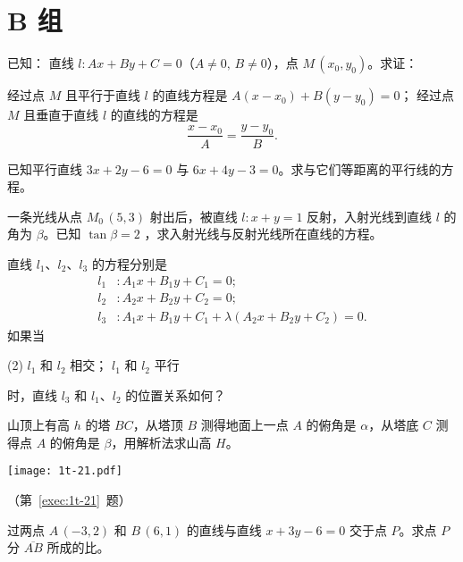 \section*{B 组}
\begin{question}[resume]
  \item 已知： 直线 $l:Ax+By+C=0$（$A\neq 0,\,B\neq 0$），点 $M\,(x_0,y_0)$。求证：
  \begin{tasks}
    \task 经过点 $M$ 且平行于直线 $l$ 的直线方程是 $A(x-x_0)+B(y-y_0)=0$；
    \task 经过点 $M$ 且垂直于直线 $l$ 的直线的方程是 \[\frac{x-x_0}{A}=\frac{y-y_0}{B}.\]
  \end{tasks}
  \item 已知平行直线 $3x+2y-6=0$ 与 $6x+4y-3=0$。求与它们等距离的平行线的方程。
  \item 一条光线从点 $M_0\,(5,3)$ 射出后，被直线 $l:x+y=1$ 反射，入射光线到直线 $l$ 的角为 $\beta$。已知 $\tan\beta = 2$ ，求入射光线与反射光线所在直线的方程。
  \item 直线 $l_1$、$l_2$、$l_3$ 的方程分别是
  \begin{align*}
    l_1 &: A_1x+B_1y+C_1 =0; \\
    l_2 &: A_2x+B_2y+C_2 =0; \\
    l_3 &: A_1x+B_1y+C_1 + \lambda(A_2x+B_2y+C_2) =0. 
  \end{align*}
  如果当 
  \begin{tasks}(2)
    \task $l_1$ 和 $l_2$ 相交；
    \task $l_1$ 和 $l_2$ 平行
  \end{tasks}
  时，直线 $l_3$ 和 $l_1$、$l_2$ 的位置关系如何？
  \item\label{exec:1t-21} 山顶上有高 $h$ 的塔 $BC$，从塔顶 $B$ 测得地面上一点 $A$ 的俯角是 $\alpha$，从塔底 $C$ 测得点 $A$ 的俯角是 $\beta$，用解析法求山高 $H$。
  \begin{figurehere}
    \begin{minipage}{\linewidth}\centering
      \texttt{[image: 1t-21.pdf]}
    \caption*{（第~\ref{exec:1t-21}~题）}
    \end{minipage}
  \end{figurehere}
  \item 过两点 $A\,(-3,2)$ 和 $B\,(6,1)$ 的直线与直线 $x+3y-6=0$ 交于点 $P$。求点 $P$ 分 $\overline{AB}$ 所成的比。
\end{question}
